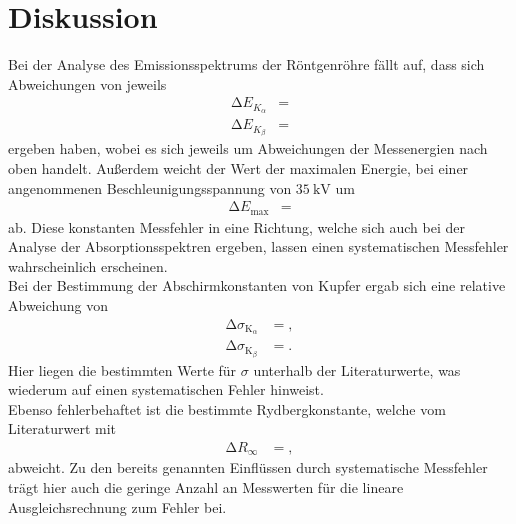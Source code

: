 \section{Diskussion}
\label{sec:Diskussion}
Bei der Analyse des Emissionsspektrums der Röntgenröhre fällt auf, dass sich Abweichungen von jeweils
\begin{align*}
  \increment E_{K_\alpha} &=  \\
  \increment E_{K_\beta} &= 
\end{align*}
ergeben haben, wobei es sich jeweils um Abweichungen der Messenergien nach oben handelt.
Außerdem weicht der Wert der maximalen Energie, bei einer angenommenen Beschleunigungsspannung von $\SI{35}{\kilo\volt}$ um
\begin{align*}
  \increment E_{\text{max}} &= 
\end{align*}
ab.
Diese konstanten Messfehler in eine Richtung, welche sich auch bei der Analyse der Absorptionsspektren ergeben, lassen einen systematischen Messfehler wahrscheinlich erscheinen.\\
Bei der Bestimmung der Abschirmkonstanten von Kupfer ergab sich eine relative Abweichung von
\begin{align*}
  \increment \sigma_{\text{K}_{\alpha}} &= , \\
  \increment \sigma_{\text{K}_{\beta}} &= .
\end{align*}
Hier liegen die bestimmten Werte für $\sigma$ unterhalb der Literaturwerte, was wiederum auf einen systematischen Fehler hinweist.\\
Ebenso fehlerbehaftet ist die bestimmte Rydbergkonstante, welche vom Literaturwert \cite{Konstanten} mit
\begin{align*}
  \increment R_\infty &= , 
\end{align*}
abweicht.
Zu den bereits genannten Einflüssen durch systematische Messfehler trägt hier auch die geringe Anzahl an Messwerten für die lineare Ausgleichsrechnung zum Fehler bei.
